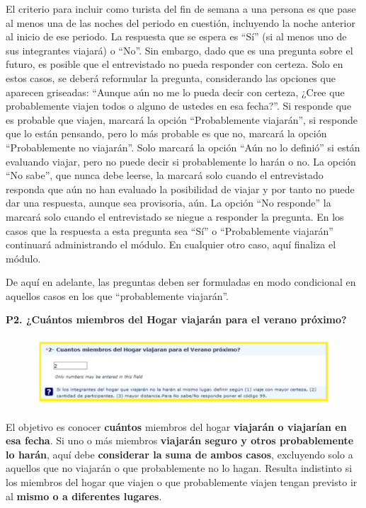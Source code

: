 \documentclass[
  openany]{book}
\begin{document}
El criterio para incluir como turista del fin de semana a una persona es que pase al menos una de las noches del periodo en cuestión, incluyendo la noche anterior al inicio de ese periodo. La respuesta que se espera es ``Sí'' (si al menos uno de sus integrantes viajará) o ``No''. Sin embargo, dado que es una pregunta sobre el futuro, es posible que el entrevistado no pueda responder con certeza. Solo en estos casos, se deberá reformular la pregunta, considerando las opciones que aparecen griseadas: ``Aunque aún no me lo pueda decir con certeza, ¿Cree que probablemente viajen todos o alguno de ustedes en esa fecha?''. Si responde que es probable que viajen, marcará la opción ``Probablemente viajarán'', si responde que lo están pensando, pero lo más probable es que no, marcará la opción ``Probablemente no viajarán''. Solo marcará la opción ``Aún no lo definió'' si están evaluando viajar, pero no puede decir si probablemente lo harán o no. La opción ``No sabe'', que nunca debe leerse, la marcará solo cuando el entrevistado responda que aún no han evaluado la posibilidad de viajar y por tanto no puede dar una respuesta, aunque sea provisoria, aún. La opción ``No responde'' la marcará solo cuando el entrevistado se niegue a responder la pregunta. En los casos que la respuesta a esta pregunta sea ``Sí'' o ``Probablemente viajarán'' continuará administrando el módulo. En cualquier otro caso, aquí finaliza el módulo.

De aquí en adelante, las preguntas deben ser formuladas en modo condicional en aquellos casos en los que ``probablemente viajarán''.

\textbf{P2. ¿Cuántos miembros del Hogar viajarán para el verano próximo?}

\begin{figure}

{\centering \includegraphics[width=1\linewidth]{imagenes/figura6-139} 

}

\end{figure}

El objetivo es conocer \textbf{cuántos} miembros del hogar \textbf{viajarán o viajarían en esa fecha}. Si uno o más miembros \textbf{viajarán seguro y otros probablemente lo harán}, aquí debe \textbf{considerar la suma de ambos casos}, excluyendo solo a aquellos que no viajarán o que probablemente no lo hagan. Resulta indistinto si los miembros del hogar que viajen o que probablemente viajen tengan previsto ir al \textbf{mismo o a diferentes lugares}.
\end{document}
